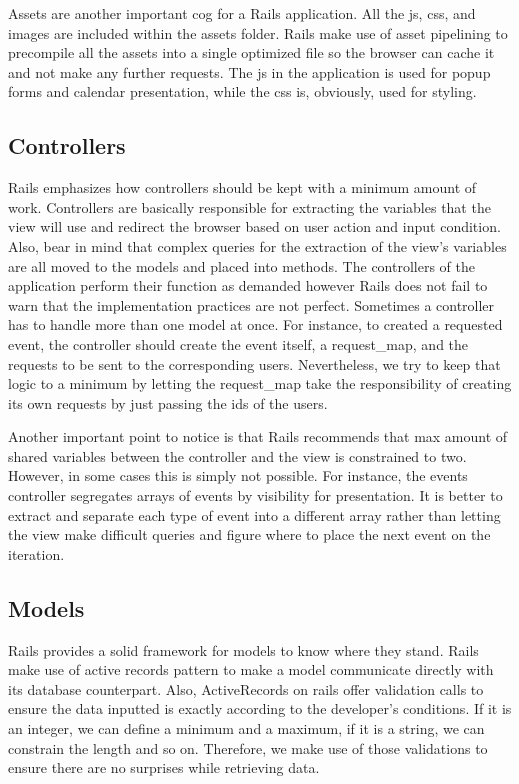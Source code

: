 \documentclass[11pt]{article}
\begin{document}
Assets are another important cog for a Rails application. All the js, css, and images are included within the assets folder. Rails make use of asset pipelining to precompile all the assets into a single optimized file so the browser can cache it and not make any further requests. The js in the application is used for popup forms and calendar presentation, while the css is, obviously, used for styling.

\subsection{Controllers}

Rails emphasizes how controllers should be kept with a minimum amount of work. Controllers are basically responsible for extracting the variables that the view will use and redirect the browser based on user action and input condition. Also, bear in mind that complex queries for the extraction of the view’s variables are all moved to the models and placed into methods. The controllers of the application perform their function as demanded however Rails does not fail to warn that the implementation practices are not perfect. Sometimes a controller has to handle more than one model at once. For instance, to created a requested event, the controller should create the event itself, a request_map, and the requests to be sent to the corresponding users. Nevertheless, we try to keep that logic to a minimum by letting the request_map take the responsibility of creating its own requests by just passing the ids of the users.

Another important point to notice is that Rails recommends that max amount of shared variables between the controller and the view is constrained to two. However, in some cases this is simply not possible. For instance, the events controller segregates arrays of events by visibility for presentation. It is better to extract and separate each type of event into a different array rather than letting the view make difficult queries and figure where to place the next event on the iteration.

\subsection{Models}

Rails provides a solid framework for models to know where they stand. Rails make use of active records pattern to make a model communicate directly with its database counterpart. Also, ActiveRecords on rails offer validation calls to ensure the data inputted is exactly according to the developer’s conditions. If it is an integer, we can define a minimum and a maximum, if it is a string, we can constrain the length and so on. Therefore, we make use of those validations to ensure there are no surprises while retrieving data.
\end{document}
